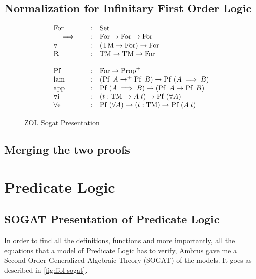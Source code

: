 \documentclass[10pt,a4paper]{article}
\begin{document}
		\subsection{Normalization for Infinitary First Order Logic}
		\begin{figure}
			\begin{tcolorbox}
				\[
				\begin{array}{lcl}
					\operatorname{For} & : & \operatorname{Set} \\
					- \implies - & : & \operatorname{For} \rightarrow \operatorname{For} \rightarrow \operatorname{For}\\
					\forall & : & (\operatorname{TM} \rightarrow \operatorname{For}) \rightarrow \operatorname{For} \\
					\operatorname{R} & : & \operatorname{TM} \rightarrow \operatorname{TM} \rightarrow \operatorname{For}\\
					\\
					\operatorname{Pf}\; & : & \operatorname{For} \rightarrow \operatorname{Prop}^+ \\
					\operatorname{lam} & : & (\operatorname{Pf}\; A \rightarrow^+ \operatorname{Pf}\; B) \rightarrow \operatorname{Pf}\; (A \implies B)\\
					\operatorname{app} & : & \operatorname{Pf}\; (A \implies B) \rightarrow (\operatorname{Pf}\; A \rightarrow \operatorname{Pf}\; B)\\
					\operatorname{\operatorname{\forall i}} & : & (t : \operatorname{TM} \rightarrow A\;t) \rightarrow \operatorname{Pf}\; (\forall A)\\
					\operatorname{\operatorname{\forall e}} & : & \operatorname{Pf}\; (\forall A) \rightarrow (t : \operatorname{TM}) \rightarrow \operatorname{Pf}\; (A\;t)\\
				\end{array}
				\]
			\end{tcolorbox}
			\caption{ZOL Sogat Presentation}
			\label{fig:ifol-sogat}
		\end{figure}
		\subsection{Merging the two proofs}
	\section{Predicate Logic}
		\subsection{SOGAT Presentation of Predicate Logic}
		
		In order to find all the definitions, functions and more importantly, all the equations that a model of Predicate Logic has to verify, Ambrus gave me a Second Order Generalized Algebraic Theory (SOGAT) of the models. It goes as described in \autoref{fig:ffol-sogat}.
		
\end{document}
